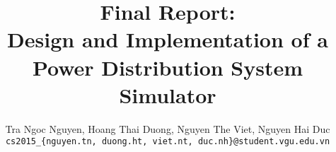 \documentclass[]{report}
\title{}
\author{}
\makeatletter
\renewcommand{\maketitle}{\bgroup\setlength{\parindent}{0pt}
	\begin{flushleft}
		\textbf{\@title}
		
		\@author
	\end{flushleft}\egroup
}
\makeatother
\begin{document}
	\title{Final Report:\\	
	Design and Implementation of a Power Distribution System Simulator}

\author{
	Tra Ngoc Nguyen, Hoang Thai Duong, Nguyen The Viet, Nguyen Hai Duc\\
	\texttt{cs2015\_\{nguyen.tn, duong.ht, viet.nt, duc.nh\}@student.vgu.edu.vn}
}
\maketitle

\setcounter{page}{1}
\tableofcontents

\newpage
{}
\setcounter{page}{1}




\end{document}
